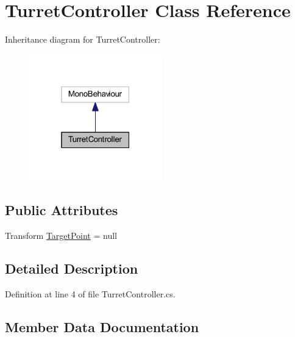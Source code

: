 \hypertarget{class_turret_controller}{}\section{Turret\+Controller Class Reference}
\label{class_turret_controller}


Inheritance diagram for Turret\+Controller\+:
\nopagebreak
\begin{figure}[H]
\begin{center}
\leavevmode
\includegraphics[width=163pt]{class_turret_controller__inherit__graph}
\end{center}
\end{figure}
\subsection*{Public Attributes}
\begin{DoxyCompactItemize}
\item 
Transform \hyperlink{class_turret_controller_ac7b9843264700d7841aa47017ccc494e}{Target\+Point} = null
\end{DoxyCompactItemize}


\subsection{Detailed Description}


Definition at line 4 of file Turret\+Controller.\+cs.



\subsection{Member Data Documentation}
\mbox{\label{class_turret_controller_ac7b9843264700d7841aa47017ccc494e}} 
